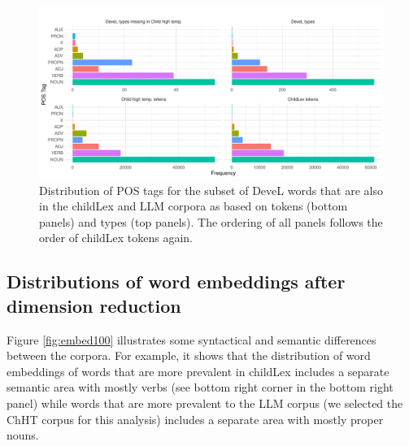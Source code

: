 \documentclass[doc, a4paper, anonymous]{apa7}
\begin{document}
\begin{figure}[!htbp]
    \includegraphics[width = 0.8\paperwidth]{figures/pos_f_devel.pdf}
    \caption{Distribution of POS tags for the subset of DeveL words that are also in the childLex and LLM corpora as based on tokens (bottom panels) and types (top panels). The ordering of all panels follows the order of childLex tokens again. }
    \label{fig:pos_f_devel}
\end{figure}

\clearpage


\subsection{Distributions of word embeddings after dimension reduction}

Figure \ref{fig:embed100} illustrates some syntactical and semantic differences between the corpora. For example, it shows that the distribution of word embeddings of words that are more prevalent in childLex includes a separate semantic area with mostly verbs (see bottom right corner in the bottom right panel) while words that are more prevalent to the LLM corpus (we selected the ChHT corpus for this analysis) includes a separate area with mostly proper nouns. 
\end{document}
